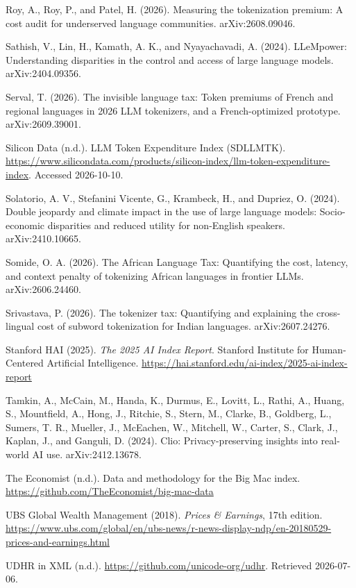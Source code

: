 \documentclass[11pt]{article}
\begin{document}
Roy, A., Roy, P., and Patel, H. (2026). Measuring the tokenization premium: A cost audit for underserved language communities. arXiv:2608.09046.

Sathish, V., Lin, H., Kamath, A. K., and Nyayachavadi, A. (2024). LLeMpower: Understanding disparities in the control and access of large language models. arXiv:2404.09356.

Serval, T. (2026). The invisible language tax: Token premiums of French and regional languages in 2026 LLM tokenizers, and a French-optimized prototype. arXiv:2609.39001.

Silicon Data (n.d.). LLM Token Expenditure Index (SDLLMTK). \url{https://www.silicondata.com/products/silicon-index/llm-token-expenditure-index}. Accessed 2026-10-10.

Solatorio, A. V., Stefanini Vicente, G., Krambeck, H., and Dupriez, O. (2024). Double jeopardy and climate impact in the use of large language models: Socio-economic disparities and reduced utility for non-English speakers. arXiv:2410.10665.

Somide, O. A. (2026). The African Language Tax: Quantifying the cost, latency, and context penalty of tokenizing African languages in frontier LLMs. arXiv:2606.24460.

Srivastava, P. (2026). The tokenizer tax: Quantifying and explaining the cross-lingual cost of subword tokenization for Indian languages. arXiv:2607.24276.

Stanford HAI (2025). \emph{The 2025 AI Index Report}. Stanford Institute for Human-Centered Artificial Intelligence. \url{https://hai.stanford.edu/ai-index/2025-ai-index-report}

Tamkin, A., McCain, M., Handa, K., Durmus, E., Lovitt, L., Rathi, A., Huang, S., Mountfield, A., Hong, J., Ritchie, S., Stern, M., Clarke, B., Goldberg, L., Sumers, T. R., Mueller, J., McEachen, W., Mitchell, W., Carter, S., Clark, J., Kaplan, J., and Ganguli, D. (2024). Clio: Privacy-preserving insights into real-world AI use. arXiv:2412.13678.

The Economist (n.d.). Data and methodology for the Big Mac index. \url{https://github.com/TheEconomist/big-mac-data}

UBS Global Wealth Management (2018). \emph{Prices \& Earnings}, 17th edition. \url{https://www.ubs.com/global/en/ubs-news/r-news-display-ndp/en-20180529-prices-and-earnings.html}

UDHR in XML (n.d.). \url{https://github.com/unicode-org/udhr}. Retrieved 2026-07-06.
\end{document}
